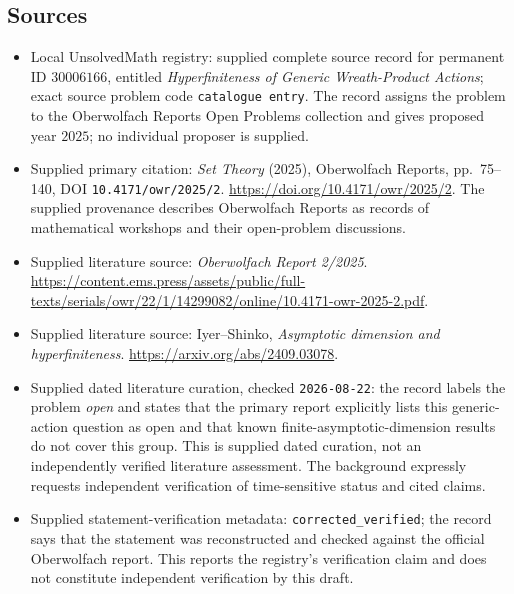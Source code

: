 \documentclass[11pt]{article}
\begin{document}
\subsection{Sources}
\begin{itemize}
\item Local UnsolvedMath registry: supplied complete source record for permanent ID \(30006166\), entitled \emph{Hyperfiniteness of Generic Wreath-Product Actions}; exact source problem code \texttt{catalogue entry}. The record assigns the problem to the Oberwolfach Reports Open Problems collection and gives proposed year \(2025\); no individual proposer is supplied.
\item Supplied primary citation: \emph{Set Theory} (2025), Oberwolfach Reports, pp.~75--140, DOI \texttt{10.4171/owr/2025/2}. \url{https://doi.org/10.4171/owr/2025/2}. The supplied provenance describes Oberwolfach Reports as records of mathematical workshops and their open-problem discussions.
\item Supplied literature source: \emph{Oberwolfach Report 2/2025}. \url{https://content.ems.press/assets/public/full-texts/serials/owr/22/1/14299082/online/10.4171-owr-2025-2.pdf}.
\item Supplied literature source: Iyer--Shinko, \emph{Asymptotic dimension and hyperfiniteness}. \url{https://arxiv.org/abs/2409.03078}.
\item Supplied dated literature curation, checked \texttt{2026-08-22}: the record labels the problem \emph{open} and states that the primary report explicitly lists this generic-action question as open and that known finite-asymptotic-dimension results do not cover this group. This is supplied dated curation, not an independently verified literature assessment. The background expressly requests independent verification of time-sensitive status and cited claims.
\item Supplied statement-verification metadata: \texttt{corrected\_verified}; the record says that the statement was reconstructed and checked against the official Oberwolfach report. This reports the registry's verification claim and does not constitute independent verification by this draft.
\end{itemize}
\end{document}
